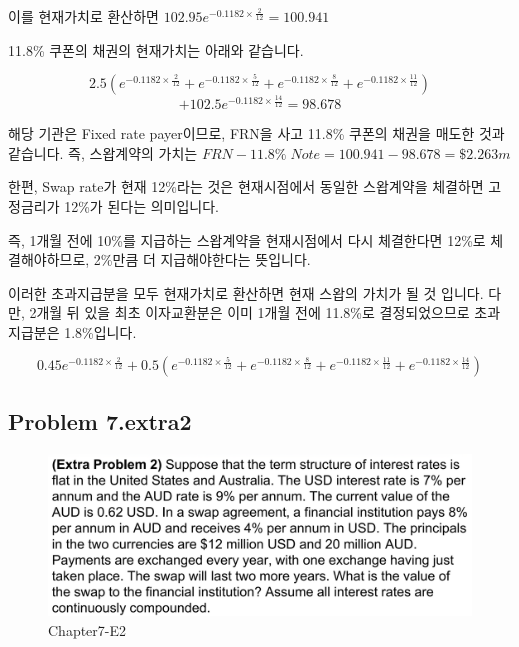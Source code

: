 \documentclass[
  letterpaper,
  DIV=11,
  numbers=noendperiod]{scrreprt}
\begin{document}
이를 현재가치로 환산하면 \(102.95e^{-0.1182\times\frac{2}{12}}=100.941\)

11.8\% 쿠폰의 채권의 현재가치는 아래와 같습니다.

\[2.5(e^{-0.1182\times\frac{2}{12}}+e^{-0.1182\times\frac{5}{12}}+e^{-0.1182\times\frac{8}{12}}+e^{-0.1182\times\frac{11}{12}})\]
\[+102.5e^{-0.1182\times\frac{14}{12}}=98.678\]

해당 기관은 Fixed rate payer이므로, FRN을 사고 11.8\% 쿠폰의 채권을
매도한 것과 같습니다. 즉, 스왑계약의 가치는
\(FRN-11.8\%\;Note=100.941-98.678=\$2.263m\)

\begin{tcolorbox}[enhanced jigsaw, titlerule=0mm, bottomtitle=1mm, left=2mm, title=\textcolor{quarto-callout-note-color}{\faInfo}\hspace{0.5em}{직관적인 풀이방법}, toptitle=1mm, bottomrule=.15mm, colframe=quarto-callout-note-color-frame, breakable, opacityback=0, rightrule=.15mm, opacitybacktitle=0.6, coltitle=black, colback=white, arc=.35mm, colbacktitle=quarto-callout-note-color!10!white, toprule=.15mm, leftrule=.75mm]

한편, Swap rate가 현재 12\%라는 것은 현재시점에서 동일한 스왑계약을
체결하면 고정금리가 12\%가 된다는 의미입니다.

즉, 1개월 전에 10\%를 지급하는 스왑계약을 현재시점에서 다시 체결한다면
12\%로 체결해야하므로, 2\%만큼 더 지급해야한다는 뜻입니다.

이러한 초과지급분을 모두 현재가치로 환산하면 현재 스왑의 가치가 될 것
입니다. 다만, 2개월 뒤 있을 최초 이자교환분은 이미 1개월 전에 11.8\%로
결정되었으므로 초과지급분은 1.8\%입니다.

\[0.45e^{-0.1182\times\frac{2}{12}}+0.5(e^{-0.1182\times\frac{5}{12}}+e^{-0.1182\times\frac{8}{12}}+e^{-0.1182\times\frac{11}{12}}+e^{-0.1182\times\frac{14}{12}})\]

\end{tcolorbox}

\subsection*{\texorpdfstring{\textbf{Problem
7.extra2}}{Problem 7.extra2}}\label{problem-7.extra2}

\begin{figure}[H]

{\centering \includegraphics{images/선물옵션_7-extra2.png}

}

\caption{Chapter7-E2}

\end{figure}%
\end{document}
